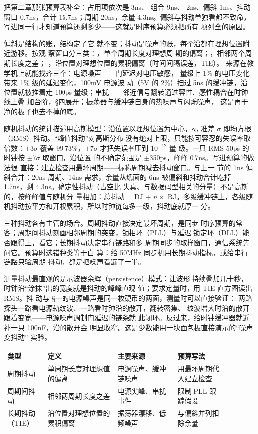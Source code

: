 把第二章那张预算表补全：占用项依次是  3ns、
组合 9ns、 2ns、偏斜 1ns、抖动窗口 0.7ns，合计
15.7ns；周期 20ns，余量 4.3ns。偏斜与抖动单独看都不致命，
写进同一行才知道预算还剩多少——这就是时序预算必须把所有
项列全的原因。

偏斜是结构的账，结构定了它
就不变；抖动是噪声的账，每个沿都在理想位置附近游移。按观
察窗口分三类：，单个周期长度对理想周
期的偏离；，相邻两个周期长度之差；
，沿位置对理想位置的累积偏离（时间间隔误差，TIE）。
来源在教学机上就能找齐三个：电源噪声——门延迟对电压敏感，
量级上 1\% 的电压变化带来 1\% 级的延迟变化，100mV 电源波
动（5V 的 2\%）扫过 5ns 的缓冲链，沿位置就被推着走 100ps
量级；串扰——邻近信号翻转通过容性、感性耦合在时钟线上叠
加台阶，§四展开；振荡器与缓冲链自身的热噪声与闪烁噪声，
这是再干净的板子也去不掉的底。

随机抖动的统计描述用高斯模型：沿位置以理想位置为中心，标
准差 $\sigma$ 即均方根（RMS）抖动。“峰值抖动”对高斯分布
没有绝对上限，只能按可容忍的失误率取倍数：$\pm$3$\sigma$
覆盖 99.73\%，$\pm$7$\sigma$ 才把失误率压到 $10^{-12}$ 量
级。一只 RMS 50ps 的时钟按 $\pm$7$\sigma$ 取窗口，沿位置
的不确定范围是 $\pm$350ps，峰峰 0.7ns。写进预算的做法很
直接：建立检查用最坏周期——标称周期减去抖动窗口。与上一
节的 1ns 偏斜合并：20ns 周期、14ns 需求，余量从纸面的 6ns
被偏斜和抖动合计吃掉 1.7ns，剩 4.3ns。确定性抖动（占空比
失真、与数据码型相关的分量）不是高斯的，按峰峰值与随机分
量相加：总抖动 = DJ + $n \times$ RJ。多级缓冲链上，各级随
机抖动按平方和开根累积，所以时钟链每多一级，抖动底就厚一
分。

三种抖动各有主管的场合。周期抖动直接决定最坏周期，是同步
时序预算的常客；周期间抖动刻画相邻周期的突变，锁相环（PLL）与延迟
锁定环（DLL）能否跟得上，看它；长期抖动决定串行链路和多
周期同步的取样窗口，通信系统先问它。预算时选错种类等于白
算：给 50MHz 同步机用长期抖动指标，或给串行链路只验周期
抖动，都是把噪声看漏了一半。

测量抖动最直观的是示波器余辉（persistence）模式：让波形
持续叠加几十秒，时钟沿“涂抹”出的宽度就是抖动的峰峰直观
值；要求定量时，用 TIE 直方图读出 RMS。抖
动与 §一的电源噪声是同一枚硬币的两面，测量时可以直接验证：
两路探头一路看电源轨纹波、一路看时钟沿的散开，翻转密集、
纹波增大时沿的散开跟着变宽——电源噪声调制门延迟的链条就
此闭环。反过来，给时钟缓冲器就近补一只 100nF，沿的散开会
明显收窄。这是少数能用一块面包板直接演示的“噪声变抖动”
实验。

\begin{longtable}{L{0.16\linewidth}L{0.28\linewidth}L{0.24\linewidth}L{0.2\linewidth}}
\toprule
类型 & 定义 & 主要来源 & 预算写法 \\
\midrule
周期抖动 & 单周期长度对理想值的偏离 & 电源噪声、缓冲链噪声 & 用最坏周期代入建立检查 \\
周期间抖动 & 相邻两周期长度之差 & 电源尖峰、串扰事件 & 限制 PLL 跟踪假设 \\
长期抖动（TIE） & 沿位置对理想位置的累积偏离 & 振荡器漂移、低频噪声 & 与偏斜并列扣除余量 \\
\bottomrule
\end{longtable}

